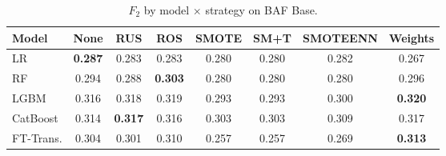 \begin{table}[ht!]
\centering
\caption{$F_2$ by model $\times$ strategy on BAF Base.}
\label{tab:factorial_baf_f2}
\begin{tabular}{l c c c c c c c}
\toprule
Model & None & RUS & ROS & SMOTE & SM+T & SMOTEENN & Weights \\
\midrule
LR         & \textbf{0.287} & 0.283 & 0.283 & 0.280 & 0.280 & 0.282 & 0.267 \\
RF         & 0.294 & 0.288 & \textbf{0.303} & 0.280 & 0.280 & 0.280 & 0.296 \\
LGBM       & 0.316 & 0.318 & 0.319 & 0.293 & 0.293 & 0.300 & \textbf{0.320} \\
CatBoost   & 0.314 & \textbf{0.317} & 0.316 & 0.303 & 0.303 & 0.309 & 0.317 \\
FT-Trans.  & 0.304 & 0.301 & 0.310 & 0.257 & 0.257 & 0.269 & \textbf{0.313} \\
\bottomrule
\end{tabular}
\end{table}